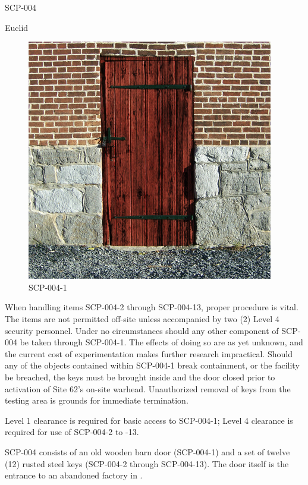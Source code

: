  SCP-004

 Euclid

\begin{figure}[h]
\begin{center}
\includegraphics[scale=1.6]{scp/004.jpg}
\linebreak SCP-004-1
\end{center}
\end{figure}

 When handling items SCP-004-2 through SCP-004-13, proper procedure is vital. The items are not permitted off-site unless accompanied by two (2) Level 4 security personnel. Under no circumstances should any other component of SCP-004 be taken through SCP-004-1. The effects of doing so are as yet unknown, and the current cost of experimentation makes further research impractical. Should any of the objects contained within SCP-004-1 break containment, or the facility be breached, the keys must be brought inside and the door closed prior to activation of Site 62’s on-site warhead. Unauthorized removal of keys from the testing area is grounds for immediate termination.

Level 1 clearance is required for basic access to SCP-004-1; Level 4 clearance is required for use of SCP-004-2 to -13.

 SCP-004 consists of an old wooden barn door (SCP-004-1) and a set of twelve (12) rusted steel keys (SCP-004-2 through SCP-004-13). The door itself is the entrance to an abandoned factory in \expunged.
\newpage

